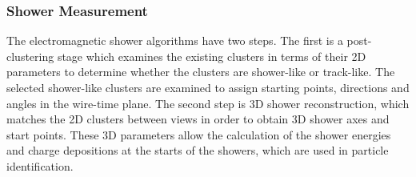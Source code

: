 




\subsubsection{Shower Measurement}


The electromagnetic shower algorithms have two
steps. The first is a post-clustering stage which examines the
existing clusters in terms of their 2D parameters to determine whether
the clusters are shower-like or track-like. 
The selected shower-like clusters are examined to assign starting points,
directions and angles in the wire-time plane. The second step is 
3D shower reconstruction, which
matches the 2D clusters between views in order to obtain 3D shower axes and start points.
These 3D parameters allow the calculation of the shower energies and charge
depositions at the starts of the showers, which are used in particle
identification. 

